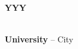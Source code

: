 
\begin{center}

  {\normalsize{\textbf{YYY}}}

\end{center}

{\normalsize{

    \lipsum[1-2]
  }
}

\begin{center}
  \hrulefill \\
  \textbf{University} -- City  \\

\end{center}
